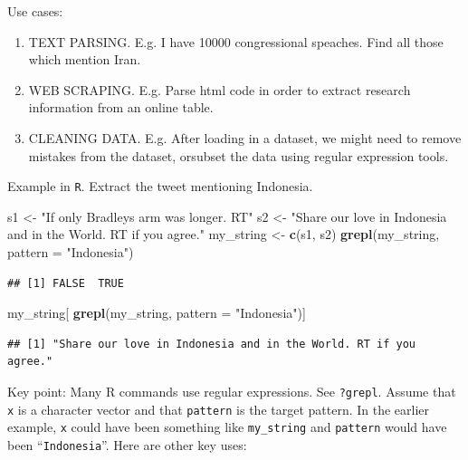 \documentclass[
]{book}
\newenvironment{Shaded}{\begin{snugshade}}{\end{snugshade}}
\newcommand{\DataTypeTok}[1]{\textcolor[rgb]{0.13,0.29,0.53}{#1}}
\newcommand{\KeywordTok}[1]{\textcolor[rgb]{0.13,0.29,0.53}{\textbf{#1}}}
\newcommand{\NormalTok}[1]{#1}
\newcommand{\StringTok}[1]{\textcolor[rgb]{0.31,0.60,0.02}{#1}}
\providecommand{\tightlist}{%
  \setlength{\itemsep}{0pt}\setlength{\parskip}{0pt}}
\theoremstyle{definition}
\theoremstyle{definition}
\theoremstyle{definition}
\theoremstyle{remark}
\begin{document}
Use cases:

\begin{enumerate}
\def\labelenumi{\arabic{enumi}.}
\tightlist
\item
  TEXT PARSING. E.g. I have 10000 congressional speaches. Find all those which mention Iran.
\item
  WEB SCRAPING. E.g. Parse html code in order to extract research information from an online table.
\item
  CLEANING DATA. E.g. After loading in a dataset, we might need to remove mistakes from the dataset, orsubset the data using regular expression tools.
\end{enumerate}

Example in \texttt{R}. Extract the tweet mentioning Indonesia.

\begin{Shaded}
\begin{Highlighting}[]
\NormalTok{s1 <{-}}\StringTok{ "If only Bradley\textquotesingle{}s arm was longer. RT"}
\NormalTok{s2 <{-}}\StringTok{ "Share our love in Indonesia and in the World. RT if you agree."} 
\NormalTok{my\_string <{-}}\StringTok{ }\KeywordTok{c}\NormalTok{(s1, s2)}
\KeywordTok{grepl}\NormalTok{(my\_string, }\DataTypeTok{pattern =} \StringTok{"Indonesia"}\NormalTok{)}
\end{Highlighting}
\end{Shaded}

\begin{verbatim}
## [1] FALSE  TRUE
\end{verbatim}

\begin{Shaded}
\begin{Highlighting}[]
\NormalTok{my\_string[ }\KeywordTok{grepl}\NormalTok{(my\_string, }\DataTypeTok{pattern =} \StringTok{"Indonesia"}\NormalTok{)]}
\end{Highlighting}
\end{Shaded}

\begin{verbatim}
## [1] "Share our love in Indonesia and in the World. RT if you agree."
\end{verbatim}

Key point: Many R commands use regular expressions. See \texttt{?grepl}. Assume that \texttt{x} is a character vector and that \texttt{pattern} is the target pattern. In the earlier example, \texttt{x} could have been something like \texttt{my\_string} and \texttt{pattern} would have been ``\texttt{Indonesia}''. Here are other key uses:
\end{document}

